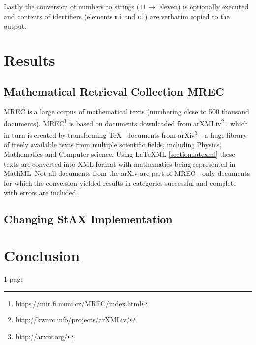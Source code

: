 \documentclass[11pt,oneside,final]{fithesis2}
\begin{document}
Lastly the conversion of numbers to strings ($11 \rightarrow$ eleven) is optionally executed and contents of identifiers (elements \texttt{mi} and \texttt{ci}) are verbatim copied to the output. 

\chapter{Results}
\section{Mathematical Retrieval Collection MREC}
MREC \cite{mrec:mrec2011} is a large corpus of mathematical texts (numbering close to 500 thousand documents). MREC\footnote{\url{https://mir.fi.muni.cz/MREC/index.html}} is based on documents downloaded from arXMLiv\footnote{\url{http://kwarc.info/projects/arXMLiv/}} \cite{mrec:arXMLiv2010}, which in turn is created by transforming \TeX~ documents from arXiv\footnote{\url{http://arxiv.org/}} - a huge library of freely available texts from multiple scientific fields, including Physics, Mathematics and Computer science. Using \LaTeX ML \ref{section:latexml} these texts are converted into XML format with mathematics being represented in MathML. Not all documents from the arXiv are part of MREC - only documents for which the conversion yielded results in categories successful and complete with errors are included.


\section{Changing StAX Implementation}


\chapter{Conclusion}
1 page

\clearpage
{}


\end{document}
